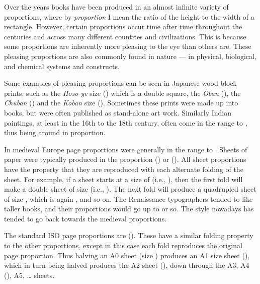 \documentclass[10pt,letterpaper,extrafontsizes]{memoir}
\begin{document}
    Over the years books have been produced in an almost infinite variety
of proportions,
where by \emph{proportion}
I mean the ratio of the height to the width of a
rectangle. However, certain proportions occur time after time throughout
the centuries and across many different countries and 
civilizations. This is because some proportions are inherently
more pleasing to the eye than others are. These pleasing proportions are
also commonly found in nature --- in  physical, biological, and chemical
systems and constructs. 


    Some examples of pleasing proportions can be
seen in Japanese wood block prints, such as the \textit{Hoso-ye} size
() which is a double square, the \textit{Oban} (), %
the \textit{Chuban} () and the \textit{Koban} size
(). Sometimes these prints were made up into books, but
were often published as stand-alone art work. Similarly Indian paintings,
at least in the 16th to the 18th century,
often come in the range  to , thus being around
 in proportion.

    In medieval Europe page proportions were generally in the range
 to . Sheets of paper were typically 
produced in the
proportion  () or  
(). 
All sheet proportions
have the property that they are reproduced with each alternate
folding of the sheet.
For example, if a sheet starts at a size of  
(i.e., ),
then the first fold will make a double sheet of size 
(i.e., ). The next fold will produce a quadrupled sheet of size
, which is again , and so on. 
 The Renaissance typographers tended to like taller books, and their 
proportions would go up to 
or so. The style nowadays has tended to go back towards the medieval
proportions.

    The standard ISO page proportions are 
 (). These
have a similar folding property to the other proportions, except in this case
each fold reproduces the original page proportion.
Thus halving an A0 sheet 
(size ) produces an A1 size sheet (),
which in turn being halved produces the A2 sheet (), down
through the A3, A4 (), A5, \ldots{} sheets.
\end{document}
